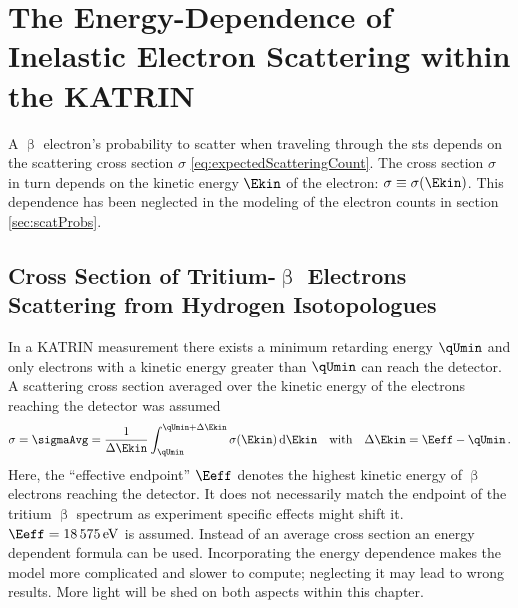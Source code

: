 \def\currentRootFolder{chapter/energyDependentCrossSec}
\def\currentFigureFolder{\currentRootFolder/fig}


\chapter{The Energy-Dependence of Inelastic Electron Scattering within the KATRIN }
\label{sec:energyDepScat}
A $\upbeta$ electron's probability to scatter when traveling through the \gls{sts} depends on the scattering cross section $\sigma$ \eqref{eq:expectedScatteringCount}. The cross section $\sigma$ in turn depends on the kinetic energy $\Ekin$ of the electron: $\sigma \equiv \sigma(\Ekin)$. This dependence has been neglected in the modeling of the electron counts in section \ref{sec:scatProbs}.

\section{Cross Section of Tritium-$\upbeta$ Electrons Scattering from Hydrogen Isotopologues}
 In a KATRIN measurement there exists a minimum retarding energy $\qUmin$ and only electrons with a kinetic energy greater than $\qUmin$ can reach the detector. A scattering cross section averaged over the kinetic energy of the electrons reaching the detector was assumed
\begin{equation}
    \sigma = \sigmaAvg = 
    \frac{1}{\Delta\Ekin} 
    \int_{\qUmin}^{\qUmin+\Delta\Ekin} \sigma(\Ekin) \d \Ekin 
    \quad \text{with} \quad
    \Delta\Ekin = \Eeff-\qUmin
    \fullstop
\end{equation}
Here, the ``effective endpoint'' $\Eeff$ denotes the highest kinetic energy of $\upbeta$ electrons reaching the detector. It does not necessarily match the endpoint of the tritium $\upbeta$ spectrum as experiment specific effects might shift it. $\Eeff=\SI{18575}{eV}$ is assumed. Instead of an average cross section an energy dependent formula can be used. Incorporating the energy dependence makes the model more complicated and slower to compute; neglecting it may lead to wrong results. More light will be shed on both aspects within this chapter.


